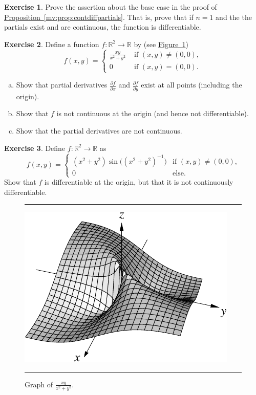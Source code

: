 \documentclass[12pt,openany]{book}
\newcommand{\R}{{\mathbb{R}}}
\theoremstyle{plain}
\theoremstyle{remark}
\theoremstyle{definition}
\newenvironment{exbox}{%
    \def\FrameCommand{\vrule width 1pt \relax\hspace {10pt}}%
    \MakeFramed {\advance \hsize -\width \FrameRestore }%
}{%
    \endMakeFramed
}
\newenvironment{exparts}{%
    \leavevmode\begin{enumerate}[a),noitemsep,topsep=0pt,parsep=0pt,partopsep=0pt]
}{%
    \end{enumerate}
}
\newenvironment{myfig}{%
\begin{figure}[h!t]
\noindent\rule{\textwidth}{0.4pt}\vspace{12pt}\par\centering}%
{\par\noindent\rule{\textwidth}{0.4pt}
\end{figure}}
\theoremstyle{exercise}
\newtheorem{exercise}{Exercise}[section]
\theoremstyle{example}
\newcommand{\figureref}[1]{\hyperref[#1]{Figure~\ref*{#1}}}
\newcommand{\propref}[1]{\hyperref[#1]{Proposition~\ref*{#1}}}
\begin{document}
\begin{exbox}
\begin{exercise}
Prove the assertion about the base case
in the proof of \propref{mv:prop:contdiffpartials}.  That is, prove that
if $n=1$ and the
the partials exist and are continuous, the function is 
differentiable.
\end{exercise}

\begin{exercise} \label{exercise:noncontpartialsexist}
Define a function $f \colon \R^2 \to \R$ by
(see \figureref{fig:xyxsqysqvol2})
\begin{equation*}
f(x,y)
=
\begin{cases}
\frac{xy}{x^2+y^2} & \text{ if $(x,y) \not= (0,0)$}, \\
0 & \text{ if $(x,y) = (0,0)$}.
\end{cases}
\end{equation*}
\begin{exparts}
\item
Show that partial derivatives 
$\frac{\partial f}{\partial x}$ and
$\frac{\partial f}{\partial y}$ exist at all points (including the origin).
\item
Show that $f$ is not continuous at the origin (and hence not
differentiable).
\item
Show that the partial derivatives are not continuous.
\end{exparts}
\end{exercise}

\begin{exercise}
Define $f \colon \R^2 \to \R$ as
\begin{equation*}
f(x,y) =
\begin{cases}
(x^2+y^2)\sin\bigl({(x^2+y^2)}^{-1}\bigr) & \text{if $(x,y)
\not= (0,0)$,} \\
0 & \text{else.}
\end{cases}
\end{equation*}
Show that $f$ is differentiable at the origin, but that it is not 
continuously differentiable.
\end{exercise}
\end{exbox}

\begin{myfig}
\includegraphics{figures/xyxsqysq}
\caption{Graph of $\frac{xy}{x^2+y^2}$.\label{fig:xyxsqysqvol2}}
\end{myfig}
\end{document}
